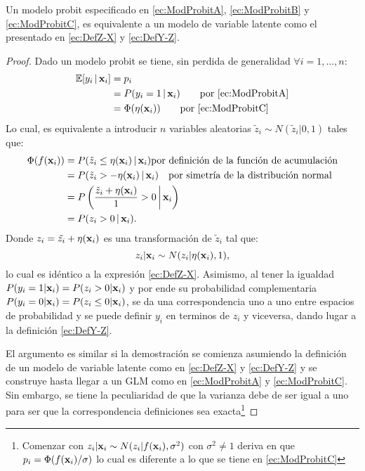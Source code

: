 \documentclass[../Main/Main.tex]{subfiles}
\begin{document}
\begin{theorem} \label{teo:Defs}
Un modelo probit especificado en \eqref{ec:ModProbitA}, \eqref{ec:ModProbitB} y \eqref{ec:ModProbitC}, es equivalente a un modelo de variable latente como el presentado en \eqref{ec:DefZ-X} y \eqref{ec:DefY-Z}.
\end{theorem}

\begin{proof} Dado un modelo probit se tiene, sin perdida de generalidad $\forall i = 1,\ldots,n$:
\begin{align*}
	\mathbb{E}[y_i\,|\,\mathbf{x}_i] &= p_i  \\
				&= P(y_i = 1\,|\,\mathbf{x}_i)  \qquad \text{por \eqref{ec:ModProbitA}}\\
				&= \Phi(\eta(\mathbf{x}_i)) \qquad \text{por \eqref{ec:ModProbitC}}
\end{align*}
Lo cual, es equivalente a introducir $n$ variables aleatorias $\tilde{z}_i \sim N(\tilde{z}_i|0,1)$ tales que:
\begin{align*}
	\Phi(f(\mathbf{x}_i)) 	&= P(\tilde{z}_i \leq \eta(\mathbf{x}_i)\,|\,\mathbf{x}_i)
				\text{por definición de la función de acumulación}\\
			      	&= P(\tilde{z}_i > - \eta(\mathbf{x}_i)\,|\,\mathbf{x}_i) \quad \text{por simetría de la distribución normal}\\
			      	&= P\left(\dfrac{\tilde{z}_i + \eta(\mathbf{x}_i)}{1} > 0\,\bigg|\,\mathbf{x}_i\right)\\
			      	&= P(z_i > 0\,|\,\mathbf{x}_i).
\end{align*}
Donde $z_i = \tilde{z_i} + \eta(\mathbf{x}_i)$ es una transformación de $\tilde{z}_i$ tal que: 
$$z_i|\mathbf{x}_i \sim N(z_i|\eta(\mathbf{x}_i),1),$$ 
lo cual es idéntico a la expresión \eqref{ec:DefZ-X}. Asimismo, al tener la igualdad $P(y_i = 1|\mathbf{x}_i) = P(z_i > 0|\mathbf{x}_i)$ y por ende su probabilidad complementaria $P(y_i = 0|\mathbf{x}_i) = P(z_i \leq 0|\mathbf{x}_i)$, se da una correspondencia uno a uno entre espacios de probabilidad y se puede definir $y_i$ en terminos de $z_i$ y viceversa, dando lugar a la definición \eqref{ec:DefY-Z}. 

El argumento es similar si la demostración se comienza asumiendo la definición de un modelo de variable latente como en \eqref{ec:DefZ-X} y \eqref{ec:DefY-Z} y se construye hasta llegar a un GLM como en  \eqref{ec:ModProbitA} y \eqref{ec:ModProbitC}. Sin embargo, se tiene la peculiaridad de que la varianza debe de ser igual a uno para ser que la correspondencia definiciones sea exacta\footnote{Comenzar con $z_i|\mathbf{x}_i \sim N(z_i|f(\mathbf{x}_i),\sigma^2)$ con $\sigma^2\neq 1$ deriva en que $p_i = \Phi(f(\mathbf{x}_i)/\sigma)$ lo cual es diferente a lo que se tiene en \eqref{ec:ModProbitC}}
\end{proof}
\end{document}
